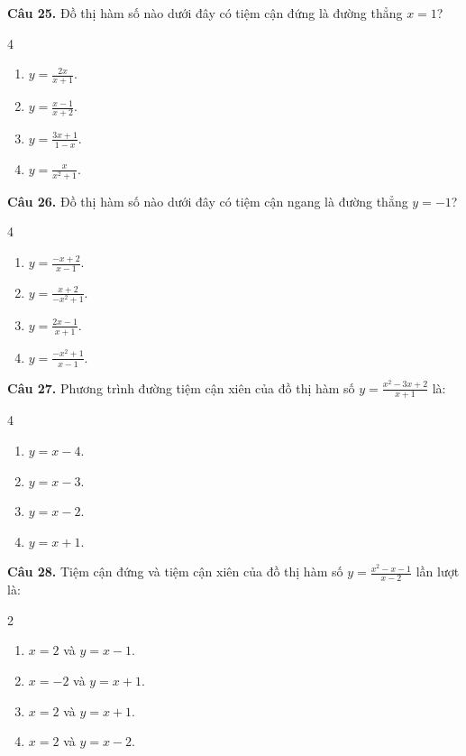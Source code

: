 \documentclass[12pt]{article}
\begin{document}
	\vspace{0.4cm}
	\noindent \textbf{Câu 25.} Đồ thị hàm số nào dưới đây có tiệm cận đứng là đường thẳng $x = 1$?
	\begin{multicols}{4}
		\begin{enumerate}[label=\textbf{\Alph*.}]
			\item $y = \frac{2x}{x + 1}$.
			\item $y = \frac{x - 1}{x + 2}$.
			\item $y = \frac{3x + 1}{1 - x}$.
			\item $y = \frac{x}{x^2 + 1}$.
		\end{enumerate}
	\end{multicols}
	
	\vspace{0.4cm}
	\noindent \textbf{Câu 26.} Đồ thị hàm số nào dưới đây có tiệm cận ngang là đường thẳng $y = -1$?
	\begin{multicols}{4}
		\begin{enumerate}[label=\textbf{\Alph*.}]
			\item $y = \frac{-x + 2}{x - 1}$.
			\item $y = \frac{x + 2}{-x^2 + 1}$.
			\item $y = \frac{2x - 1}{x + 1}$.
			\item $y = \frac{-x^2 + 1}{x - 1}$.
		\end{enumerate}
	\end{multicols}
	
	\vspace{0.4cm}
	\noindent \textbf{Câu 27.} Phương trình đường tiệm cận xiên của đồ thị hàm số $y = \frac{x^2 - 3x + 2}{x + 1}$ là:
	\begin{multicols}{4}
		\begin{enumerate}[label=\textbf{\Alph*.}]
			\item $y = x - 4$.
			\item $y = x - 3$.
			\item $y = x - 2$.
			\item $y = x + 1$.
		\end{enumerate}
	\end{multicols}
	
	\vspace{0.4cm}
	\noindent \textbf{Câu 28.} Tiệm cận đứng và tiệm cận xiên của đồ thị hàm số $y = \frac{x^2 - x - 1}{x - 2}$ lần lượt là:
	\begin{multicols}{2}
		\begin{enumerate}[label=\textbf{\Alph*.}]
			\item $x = 2$ và $y = x - 1$.
			\item $x = -2$ và $y = x + 1$.
			\item $x = 2$ và $y = x + 1$.
			\item $x = 2$ và $y = x - 2$.
		\end{enumerate}
	\end{multicols}
	
\end{document}
